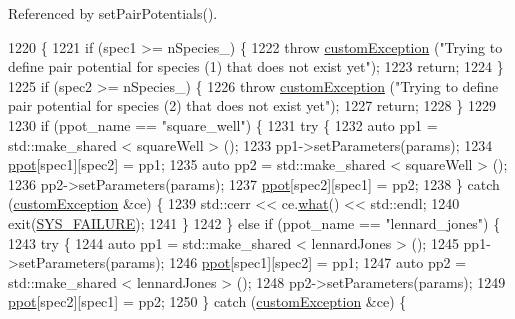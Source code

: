 Referenced by set\-Pair\-Potentials().


\begin{DoxyCode}
1220                                                                                                            
                                                \{
1221     \textcolor{keywordflow}{if} (spec1 >= nSpecies\_) \{
1222         \textcolor{keywordflow}{throw} \hyperlink{classcustom_exception}{customException} (\textcolor{stringliteral}{"Trying to define pair potential for species (1) that does
       not exist yet"});
1223         \textcolor{keywordflow}{return};
1224     \}
1225     \textcolor{keywordflow}{if} (spec2 >= nSpecies\_) \{
1226         \textcolor{keywordflow}{throw} \hyperlink{classcustom_exception}{customException} (\textcolor{stringliteral}{"Trying to define pair potential for species (2) that does
       not exist yet"});
1227         \textcolor{keywordflow}{return};
1228     \}
1229 
1230     \textcolor{keywordflow}{if} (ppot\_name == \textcolor{stringliteral}{"square\_well"}) \{
1231         \textcolor{keywordflow}{try} \{
1232             \textcolor{keyword}{auto} pp1 = std::make\_shared < squareWell > ();
1233             pp1->setParameters(params);
1234             \hyperlink{classsim_system_ad2e290b5963f132e6a3a56cee35c8e9f}{ppot}[spec1][spec2] = pp1;
1235             \textcolor{keyword}{auto} pp2 = std::make\_shared < squareWell > ();
1236             pp2->setParameters(params);
1237             \hyperlink{classsim_system_ad2e290b5963f132e6a3a56cee35c8e9f}{ppot}[spec2][spec1] = pp2;
1238         \} \textcolor{keywordflow}{catch} (\hyperlink{classcustom_exception}{customException} &ce) \{
1239             std::cerr << ce.\hyperlink{classcustom_exception_aeb6ab5848b038adfc68fde86a512f691}{what}() << std::endl;
1240             exit(\hyperlink{global_8h_a428dfe1ef0a6ff4b1fdebf275f6aff2e}{SYS\_FAILURE});
1241         \}
1242     \} \textcolor{keywordflow}{else} \textcolor{keywordflow}{if} (ppot\_name == \textcolor{stringliteral}{"lennard\_jones"}) \{
1243         \textcolor{keywordflow}{try} \{
1244             \textcolor{keyword}{auto} pp1 = std::make\_shared < lennardJones > ();
1245             pp1->setParameters(params);
1246             \hyperlink{classsim_system_ad2e290b5963f132e6a3a56cee35c8e9f}{ppot}[spec1][spec2] = pp1;
1247             \textcolor{keyword}{auto} pp2 = std::make\_shared < lennardJones > ();
1248             pp2->setParameters(params);
1249             \hyperlink{classsim_system_ad2e290b5963f132e6a3a56cee35c8e9f}{ppot}[spec2][spec1] = pp2;
1250         \} \textcolor{keywordflow}{catch} (\hyperlink{classcustom_exception}{customException} &ce) \{

\end{DoxyCode}
